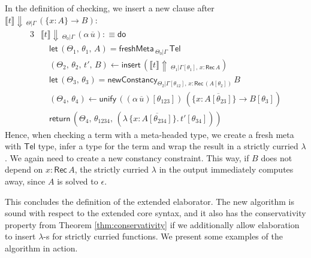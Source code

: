 \documentclass[acmsmall,screen,dvipsnames]{acmart}\settopmatter{}
\newcommand{\slet}{\boldsymbol{\mathsf{let}}}
\newcommand{\freshMeta}[3]{\mathsf{freshMeta}\,_{#1|#2}\,#3}
\newcommand{\newConstancy}[5]{\mathsf{newConstancy}_{#1|#2,\,#3 : \Rec\,#4}\,#5}
\newcommand{\unify}{\mathsf{unify}}
\newcommand{\echeck}[4]{\llbracket#1\rrbracket\!\Downarrow\,_{#2|#3}\,#4}
\newcommand{\einfer}[3]{\llbracket#1\rrbracket\!\Uparrow\,_{#2|#3}}
\newcommand{\edo}{\boldsymbol{\mathsf{do}}}
\newcommand{\ereturn}{\boldsymbol{\mathsf{return}}}
\newcommand{\einsert}{\mathsf{insert}}
\newcommand{\Tel}{\mathsf{Tel}}
\newcommand{\Rec}{\mathsf{Rec}}
\newcommand{\ol}[1]{\overline{#1}}
\theoremstyle{remark}
\begin{document}
In the definition of checking, we insert a new clause after
$\echeck{t}{\Theta}{\Gamma}{(\{x : A\}\to B)}$:
\begin{alignat*}{3}
& \echeck{t}{\Theta_0}{\Gamma}{(\alpha\,\ol{u})} :\equiv \edo\\
& \quad \slet\,(\Theta_1,\,\theta_1,\,A) = \freshMeta{\Theta_0}{\Gamma}{\Tel}\\
&\quad(\Theta_2,\,\theta_2,\,t',\,B)\leftarrow
            \einsert\,(\einfer{t}{\Theta_1}{\Gamma[\theta_1],\,x:\Rec\,A}) \\
& \quad \slet\,(\Theta_3,\,\theta_3) = \newConstancy{\Theta_2}{\Gamma[\theta_{12}]}{x}{(A[\theta_2])}{B}\\
& \quad (\Theta_4,\,\theta_4) \leftarrow
            \unify\, ((\alpha\,\ol{u})[\theta_{123}])\,(\{x : \ol{A[\theta_{23}]}\} \to B[\theta_3])\\
& \quad \ereturn\,(\Theta_4,\,\theta_{1234},\,(\lambda\,\{x : \ol{A[\theta_{234}]}\}.\,t'[\theta_{34}]))
\end{alignat*}
Hence, when checking a term with a meta-headed type, we create a fresh meta with
$\Tel$ type, infer a type for the term and wrap the result in a strictly curried
$\lambda$. We again need to create a new constancy constraint. This way, if $B$
does not depend on $x : \Rec\,A$, the strictly curried $\lambda$ in the output
immediately computes away, since $A$ is solved to $\epsilon$.

This concludes the definition of the extended elaborator. The new algorithm is
sound with respect to the extended core syntax, and it also has the
conservativity property from Theorem \ref{thm:conservativity} if we additionally
allow elaboration to insert $\lambda$-s for strictly curried functions. We present
some examples of the algorithm in action.
\end{document}
